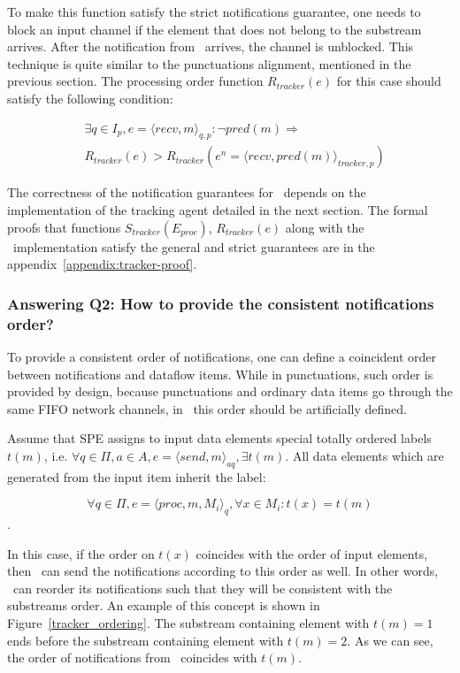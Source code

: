 To make this function satisfy the strict notifications guarantee, one needs to block an input channel if the element that does not belong to the substream arrives. After the notification from \tracker\ arrives, the channel is unblocked. This technique is quite similar to the punctuations alignment, mentioned in the previous section. The processing order function $R_{tracker}(e)$ for this case should satisfy the following condition:

\begin{align*}
& \exists q \in I_p, e = \langle recv,m \rangle_{q,p}: \neg pred(m) \Longrightarrow \\ 
& R_{tracker}(e) > R_{tracker}(e^{n}= \langle recv,pred(m) \rangle_{tracker,p})
\end{align*}

The correctness of the notification guarantees for \tracker\ depends on the implementation of the tracking agent detailed in the next section. The formal proofs that functions $S_{tracker}(E_{proc})$, $R_{tracker}(e)$ along with the \tracker\ implementation satisfy the general and strict guarantees are in the appendix~\ref{appendix:tracker-proof}.

\subsubsection{Answering Q2: How to provide the consistent notifications order?}
To provide a consistent order of notifications, one can define a coincident order between notifications and dataflow items. While in punctuations, such order is provided by design, because punctuations and ordinary data items go through the same FIFO network channels, in \tracker\, this order should be artificially defined.

Assume that SPE assigns to input data elements special totally ordered labels $t(m)$, i.e. $\forall q\in \Pi,a\in A, e=\langle send,m\rangle_{aq}, \exists t(m)$. All data elements which are generated from the input item inherit the label: 

$$\forall q\in \Pi, e=\langle proc,m,M_i\rangle_q, \forall x \in M_i : t(x) = t(m)$$.

In this case, if the order on $t(x)$ coincides with the order of input elements, then \tracker\ can send the notifications according to this order as well. In other words, \tracker\ can reorder its notifications such that they will be consistent with the substreams order. An example of this concept is shown in Figure~\ref{tracker_ordering}. The substream containing element with $t(m)=1$ ends before the substream containing element with $t(m)=2$. As we can see, the order of notifications from \tracker\ coincides with $t(m)$.

